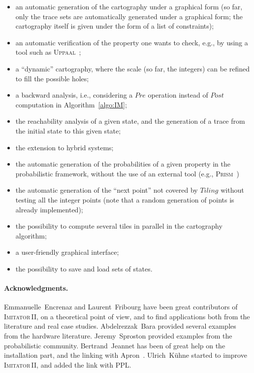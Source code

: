 \documentclass[a4paper,10pt]{article}
\newcommand{\tiling}{\mathit{Tiling}}
\newcommand{\imitatordeux}{\textsc{Imitator}\,II}
\newcommand{\prism}{\textsc{Prism}}
\newcommand{\uppaal}{\textsc{Uppaal}}
\begin{document}
\begin{itemize}
	\item an automatic generation of the cartography under a graphical form (so far, only the trace sets are automatically generated under a graphical form; the cartography itself is given under the form of a list of constraints);
	\item an automatic verification of the property one wants to check, e.g., by using a tool such as \uppaal{}~\cite{lpy97};
	\item a ``dynamic'' cartography, where the scale (so far, the integers) can be refined to fill the possible holes;
	\item a backward analysis, i.e., considering a $\mathit{Pre}$ operation instead of $\mathit{Post}$ computation in Algorithm~\ref{algo:IM};
	\item the reachability analysis of a given state, and the generation of a trace from the initial state to this given state;
	\item the extension to hybrid systems;
	\item the automatic generation of the probabilities of a given property in the probabilistic framework, without the use of an external tool (e.g., \prism{}~\cite{hknp06})
	\item the automatic generation of the ``next point'' not covered by $\tiling$ without testing all the integer points (note that a random generation of points is already implemented);
	\item the possibility to compute several tiles in parallel in the cartography algorithm;
	\item a user-friendly graphical interface;
	\item the possibility to save and load sets of states.
\end{itemize}


\paragraph{Acknowledgments.}

Emmanuelle~Encrenaz and Laurent~Fribourg have been great contributors of \imitatordeux{}, on a theoretical point of view, and to find applications both from the literature and real case studies.
Abdelrezzak~Bara provided several examples from the hardware literature.
Jeremy~Sproston provided examples from the probabilistic community.
Bertrand~Jeannet has been of great help on the installation part, and the linking with Apron~\cite{jm09}.
Ulrich~K\"uhne started to improve \imitatordeux{}, and added the link with PPL.
\end{document}
